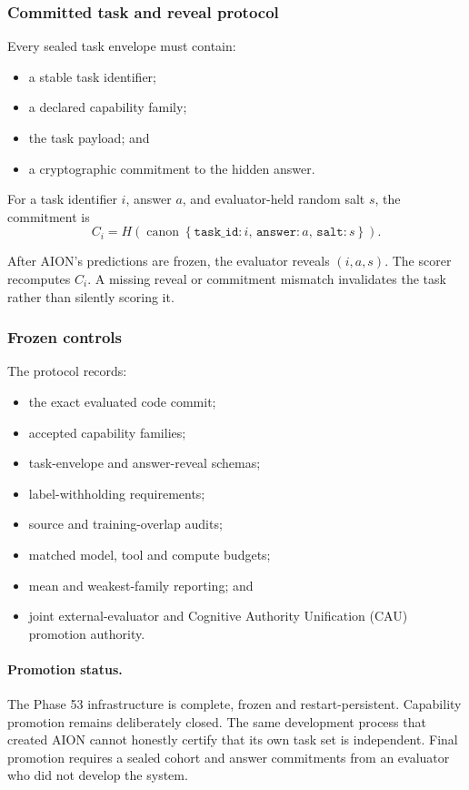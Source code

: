 \subsubsection{Committed task and reveal protocol}

Every sealed task envelope must contain:
\begin{itemize}
    \item a stable task identifier;
    \item a declared capability family;
    \item the task payload; and
    \item a cryptographic commitment to the hidden answer.
\end{itemize}

For a task identifier \(i\), answer \(a\), and evaluator-held random salt
\(s\), the commitment is
\[
C_i
=
H\!\left(
  \operatorname{canon}
  \left\{
    \texttt{task\_id}:i,\,
    \texttt{answer}:a,\,
    \texttt{salt}:s
  \right\}
\right).
\]

After AION's predictions are frozen, the evaluator reveals
\((i,a,s)\).  The scorer recomputes \(C_i\).  A missing reveal or commitment
mismatch invalidates the task rather than silently scoring it.

\subsubsection{Frozen controls}

The protocol records:
\begin{itemize}
    \item the exact evaluated code commit;
    \item accepted capability families;
    \item task-envelope and answer-reveal schemas;
    \item label-withholding requirements;
    \item source and training-overlap audits;
    \item matched model, tool and compute budgets;
    \item mean and weakest-family reporting; and
    \item joint external-evaluator and Cognitive Authority Unification (CAU)
    promotion authority.
\end{itemize}

\paragraph{Promotion status.}
The Phase 53 infrastructure is complete, frozen and restart-persistent.
Capability promotion remains deliberately closed.  The same development
process that created AION cannot honestly certify that its own task set is
independent.  Final promotion requires a sealed cohort and answer commitments
from an evaluator who did not develop the system.

